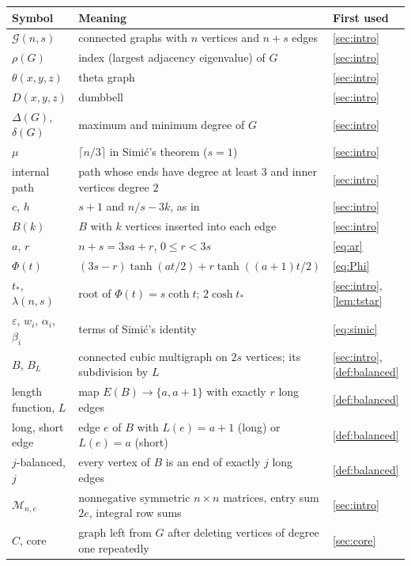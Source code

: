 \documentclass[11pt]{article}
\theoremstyle{definition}
\theoremstyle{remark}
\newcommand{\G}{\mathcal{G}}
\begin{document}
{\small
\begin{longtable}{l>{\raggedright\arraybackslash}p{}>{\raggedright\arraybackslash}p{}}
\toprule
Symbol & Meaning & First used\\
\midrule
\endhead
$\G(n,s)$ & connected graphs with $n$ vertices and $n+s$ edges & \cref{sec:intro}\\
$\rho(G)$ & index (largest adjacency eigenvalue) of $G$ & \cref{sec:intro}\\
$\theta(x,y,z)$ & theta graph & \cref{sec:intro}\\
$D(x,y,z)$ & dumbbell & \cref{sec:intro}\\
$\Delta(G)$, $\delta(G)$ & maximum and minimum degree of $G$ & \cref{sec:intro}\\
$\mu$ & $\lceil n/3\rceil$ in Simi\'c's theorem ($s=1$) & \cref{sec:intro}\\
internal path & path whose ends have degree at least $3$ and inner vertices degree $2$ & \cref{sec:intro}\\
$c$, $h$ & $s+1$ and $n/s-3k$, as in~\cite{Be19} & \cref{sec:intro}\\
$B(k)$ & $B$ with $k$ vertices inserted into each edge & \cref{sec:intro}\\
$a$, $r$ & $n+s=3sa+r$, $0\le r<3s$ & \eqref{eq:ar}\\
$\Phi(t)$ & $(3s-r)\tanh(at/2)+r\tanh((a+1)t/2)$ & \eqref{eq:Phi}\\
$t_*$, $\lambda(n,s)$ & root of $\Phi(t)=s\coth t$; $2\cosh t_*$ & \cref{sec:intro}, \cref{lem:tstar}\\
$\varepsilon$, $w_i$, $\alpha_i$, $\beta_i$ & terms of Simi\'c's identity~\cite[eq.~(2)]{Be19} & \eqref{eq:simic}\\
$B$, $B_L$ & connected cubic multigraph on $2s$ vertices; its subdivision by $L$ & \cref{sec:intro}, \cref{def:balanced}\\
length function, $L$ & map $E(B)\to\{a,a+1\}$ with exactly $r$ long edges & \cref{def:balanced}\\
long, short edge & edge $e$ of $B$ with $L(e)=a+1$ (long) or $L(e)=a$ (short) & \cref{def:balanced}\\
$j$-balanced, $j$ & every vertex of $B$ is an end of exactly $j$ long edges & \cref{def:balanced}\\
$\mathcal M_{n,e}$ & nonnegative symmetric $n\times n$ matrices, entry sum $2e$, integral row sums & \cref{sec:intro}\\
$C$, core & graph left from $G$ after deleting vertices of degree one repeatedly & \cref{sec:core}\\

\end{longtable}}
\end{document}
